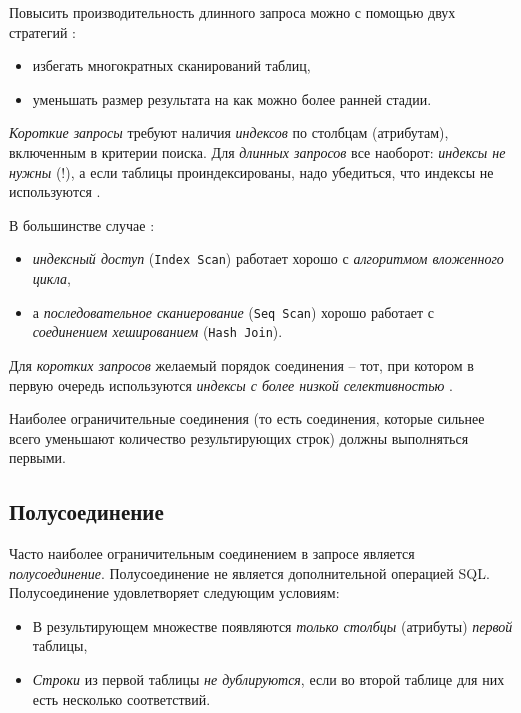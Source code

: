 \documentclass[%
	11pt,
	a4paper,
	utf8,
		]{article}
\begin{document}
Повысить производительность длинного запроса можно с помощью двух стратегий \cite[]{dombrovskaya:postgresql-2022}:
\begin{itemize}
	\item избегать многократных сканирований таблиц,
	
	\item уменьшать размер результата на как можно более ранней стадии.
\end{itemize}

\emph{Короткие запросы} требуют наличия \emph{индексов} по столбцам (атрибутам), включенным в критерии поиска. Для \emph{длинных запросов} все наоборот: \emph{индексы не нужны} (!), а если таблицы проиндексированы, надо убедиться, что индексы не используются \cite[]{dombrovskaya:postgresql-2022}.

В большинстве случае \cite[]{dombrovskaya:postgresql-2022}:
\begin{itemize}
	\color{blue}
	\item \emph{индексный доступ} (\verb|Index Scan|) работает хорошо с \emph{алгоритмом вложенного цикла},
	
	\item а \emph{последовательное сканиерование} (\verb|Seq Scan|) хорошо работает с \emph{соединением хешированием} (\verb|Hash Join|).
\end{itemize}

Для \emph{коротких запросов} желаемый порядок соединения -- тот, при котором в первую очередь используются \emph{индексы с более низкой селективностью} \cite[]{dombrovskaya:postgresql-2022}.


Наиболее ограничительные соединения (то есть соединения, которые сильнее всего уменьшают количество результирующих строк) должны выполняться первыми.

\subsection{Полусоединение}

Часто наиболее ограничительным соединением в запросе является \emph{полусоединение}. Полусоединение не является дополнительной операцией SQL. Полусоединение удовлетворяет следующим условиям:
\begin{itemize}
	\item В результирующем множестве появляются \emph{только столбцы} (атрибуты) \emph{первой} таблицы,
	
	\item \emph{Строки} из первой таблицы \emph{не дублируются}, если во второй таблице для них есть несколько соответствий.
\end{itemize}
\end{document}
